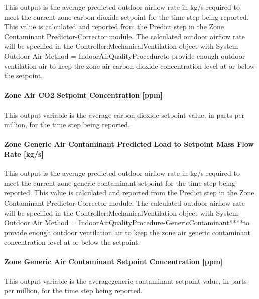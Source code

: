 This output is the average predicted outdoor airflow rate in kg/s required to meet the current zone carbon dioxide setpoint for the time step being reported. This value is calculated and reported from the Predict step in the Zone Contaminant Predictor-Corrector module. The calculated outdoor airflow rate will be specified in the Controller:MechanicalVentilation object with System Outdoor Air Method = IndoorAirQualityProcedureto provide enough outdoor ventilation air to keep the zone air carbon dioxide concentration level at or below the setpoint.

\paragraph{Zone Air CO2 Setpoint Concentration {[}ppm{]}}\label{zone-air-co2-setpoint-concentration-ppm}

This output variable is the average carbon dioxide setpoint value, in parts per million, for the time step being reported.

\paragraph{Zone Generic Air Contaminant Predicted Load to Setpoint Mass Flow Rate {[}kg/s{]}}\label{zone-generic-air-contaminant-predicted-load-to-setpoint-mass-flow-rate-kgs}

This output is the average predicted outdoor airflow rate in kg/s required to meet the current zone generic contaminant setpoint for the time step being reported. This value is calculated and reported from the Predict step in the Zone Contaminant Predictor-Corrector module. The calculated outdoor airflow rate will be specified in the Controller:MechanicalVentilation object with System Outdoor Air Method = IndoorAirQualityProcedure-GenericContaminant****to provide enough outdoor ventilation air to keep the zone air generic contaminant concentration level at or below the setpoint.

\paragraph{Zone Generic Air Contaminant Setpoint Concentration {[}ppm{]}}\label{zone-generic-air-contaminant-setpoint-concentration-ppm}

This output variable is the averagegeneric contaminant setpoint value, in parts per million, for the time step being reported.
